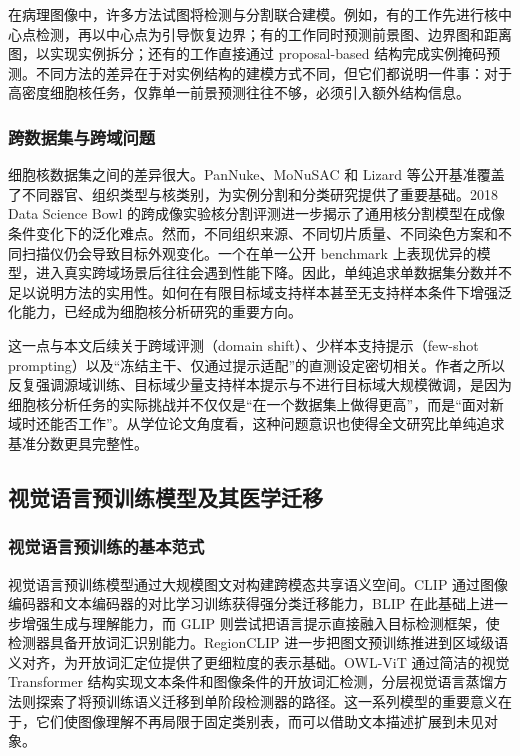在病理图像中，许多方法试图将检测与分割联合建模。例如，有的工作先进行核中心点检测，再以中心点为引导恢复边界；有的工作同时预测前景图、边界图和距离图，以实现实例拆分；还有的工作直接通过 proposal-based 结构完成实例掩码预测。不同方法的差异在于对实例结构的建模方式不同，但它们都说明一件事：对于高密度细胞核任务，仅靠单一前景预测往往不够，必须引入额外结构信息。

\subsubsection{跨数据集与跨域问题}
细胞核数据集之间的差异很大。PanNuke、MoNuSAC 和 Lizard 等公开基准覆盖了不同器官、组织类型与核类别，为实例分割和分类研究提供了重要基础\cite{gamper2019pannuke,verma2021monusac,graham2021lizard}。2018 Data Science Bowl 的跨成像实验核分割评测进一步揭示了通用核分割模型在成像条件变化下的泛化难点\cite{caicedo2019datasciencebowl}。然而，不同组织来源、不同切片质量、不同染色方案和不同扫描仪仍会导致目标外观变化。一个在单一公开 benchmark 上表现优异的模型，进入真实跨域场景后往往会遇到性能下降。因此，单纯追求单数据集分数并不足以说明方法的实用性。如何在有限目标域支持样本甚至无支持样本条件下增强泛化能力，已经成为细胞核分析研究的重要方向。

这一点与本文后续关于跨域评测（domain shift）、少样本支持提示（few-shot prompting）以及“冻结主干、仅通过提示适配”的直测设定密切相关。作者之所以反复强调源域训练、目标域少量支持样本提示与不进行目标域大规模微调，是因为细胞核分析任务的实际挑战并不仅仅是“在一个数据集上做得更高”，而是“面对新域时还能否工作”。从学位论文角度看，这种问题意识也使得全文研究比单纯追求基准分数更具完整性。

\subsection{视觉语言预训练模型及其医学迁移}
\subsubsection{视觉语言预训练的基本范式}
视觉语言预训练模型通过大规模图文对构建跨模态共享语义空间。CLIP 通过图像编码器和文本编码器的对比学习训练获得强分类迁移能力，BLIP 在此基础上进一步增强生成与理解能力，而 GLIP 则尝试把语言提示直接融入目标检测框架，使检测器具备开放词汇识别能力\cite{radford2021learning,li2022glip}。RegionCLIP 进一步把图文预训练推进到区域级语义对齐，为开放词汇定位提供了更细粒度的表示基础\cite{zhong2022regionclip}。OWL-ViT 通过简洁的视觉 Transformer 结构实现文本条件和图像条件的开放词汇检测，分层视觉语言蒸馏方法则探索了将预训练语义迁移到单阶段检测器的路径\cite{minderer2022owlvit,ma2022hierkd}。这一系列模型的重要意义在于，它们使图像理解不再局限于固定类别表，而可以借助文本描述扩展到未见对象。

